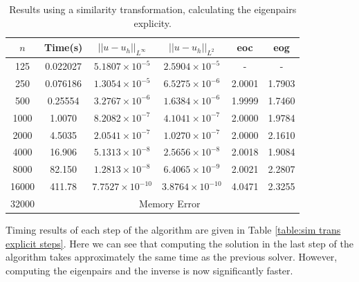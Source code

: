 \documentclass[11pt]{article}
\numberwithin{equation}{section}
\begin{document}
\begin{table}[H]
\centering
\begin{tabular}{|c|c|c|c|c|c|}
\hline
$n$ & Time(s) & $|| u - u_h ||_{L^{\infty}}$ &$|| u - u_h ||_{L^{2}}$ & eoc & eog\\
\hline
125 & 0.022027 & $5.1807 \times 10^{-5}$ & $2.5904 \times 10^{-5}$ & - & -  \\
250 & 0.076186 & $1.3054 \times 10^{-5}$ & $6.5275 \times 10^{-6}$ & 2.0001 & 1.7903  \\
500 & 0.25554 & $3.2767 \times 10^{-6}$ & $1.6384 \times 10^{-6}$ & 1.9999 & 1.7460 \\
1000 & 1.0070 & $8.2082 \times 10^{-7}$ & $4.1041 \times 10^{-7}$ & 2.0000 & 1.9784  \\
2000 & 4.5035 & $2.0541 \times 10^{-7}$ & $1.0270 \times 10^{-7}$ & 2.0000 & 2.1610 \\
4000 & 16.906 & $5.1313 \times 10^{-8}$ & $2.5656 \times 10^{-8}$ & 2.0018 & 1.9084  \\
8000 & 82.150 & $1.2813 \times 10^{-8}$ & $6.4065 \times 10^{-9}$ & 2.0021 & 2.2807  \\
16000 & 411.78 & $7.7527 \times 10^{-10}$ & $3.8764 \times 10^{-10}$ & 4.0471 & 2.3255 \\
\cline{2-6}
32000 & \multicolumn{5}{c|}{Memory Error} \\
\hline
\end{tabular}
\captionsetup{justification=centering}
\caption{Results using a similarity transformation, calculating the eigenpairs explicity.}
\label{table:sim trans explicit}
\end{table}

Timing results of each step of the algorithm are given in Table \ref{table:sim trans explicit steps}. Here we can see that computing the solution in the last step of the algorithm takes approximately the same time as the previous solver. However, computing the eigenpairs and the inverse is now significantly faster.
\end{document}
